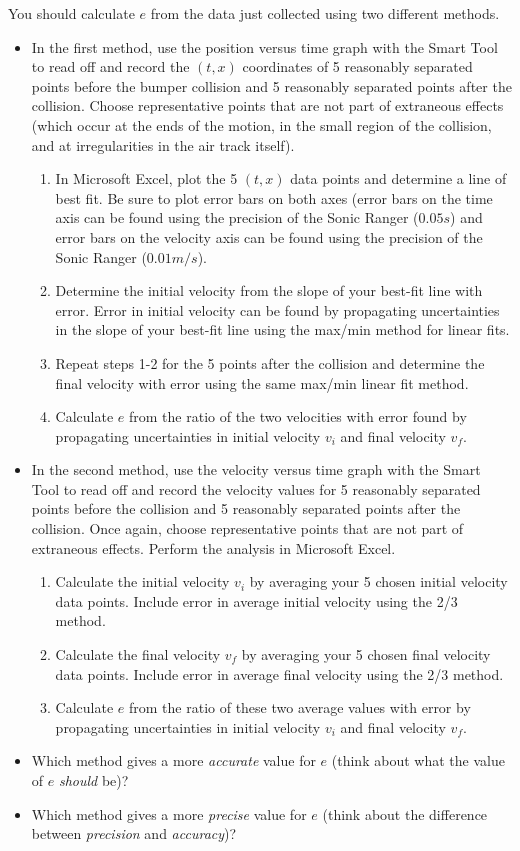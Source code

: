 You should calculate $e$ from the data just collected using two different methods. \myskip
\begin{itemize}
\item In the first method, use the position versus time graph with the Smart Tool to read off and record the $(t,x)$ coordinates of 5 reasonably separated points before the bumper collision and 5 reasonably separated points after the collision.  Choose representative points that are not part of extraneous effects (which occur at the ends of the motion, in the small region of the collision, and at irregularities in the air track itself).
\begin{enumerate}
\item In Microsoft Excel, plot the 5 $(t,x)$ data points and determine a line of best fit. Be sure to plot error bars on both axes (error bars on the time axis can be found using the precision of the Sonic Ranger ($0.05 s$) and error bars on the velocity axis can be found using the precision of the Sonic Ranger ($0.01 m/s$).
\item Determine the initial velocity from the slope of your best-fit line with error. Error in initial velocity can be found by propagating uncertainties in the slope of your best-fit line using the max/min method for linear fits.
\item    Repeat steps 1-2 for the 5 points after the collision and determine the final velocity with error using the same max/min linear fit method.
    \item Calculate $e$ from the ratio of the two velocities with error found by propagating uncertainties in initial velocity $v_i$ and final velocity $v_f$.
\end{enumerate}

\item In the second method, use the velocity versus time graph with the Smart Tool to read off and record the velocity values for 5 reasonably separated points before the collision and 5 reasonably separated points after the collision.  Once again, choose representative points that are not part of extraneous effects. Perform the analysis in Microsoft Excel.
\begin{enumerate}
\item Calculate the initial velocity $v_i$ by averaging your 5 chosen initial velocity data points. Include error in average initial velocity using the 2/3 method.
\item Calculate the final velocity $v_f$ by averaging your 5 chosen final velocity data points. Include error in average final velocity using the 2/3 method.
    \item Calculate $e$ from the ratio of these two average values with error by propagating uncertainties in initial velocity $v_i$ and final velocity $v_f$.
        \end{enumerate}
    \item Which method  gives a more {\it{accurate}} value for $e$ (think about what the value of $e$ {\it{should}} be)?
    \item Which method gives a more {\it{precise}} value for $e$ (think about the difference between {\it{precision}} and {\it{accuracy}})?
\end{itemize}

